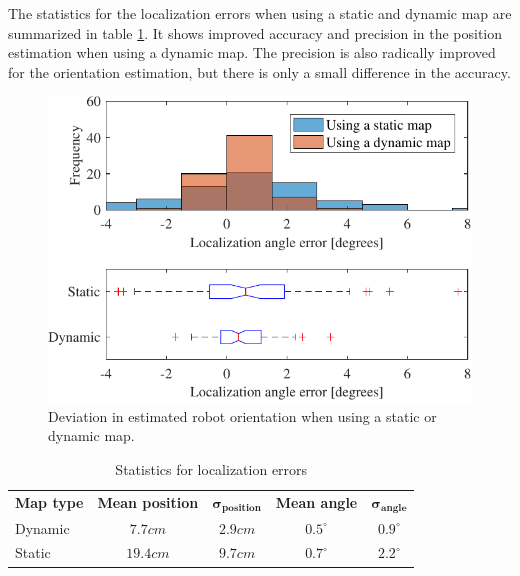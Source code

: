 The statistics for the localization errors when using a static and dynamic map are summarized in table \ref{tab:localization_errors}. It shows improved accuracy and precision in the position estimation when using a dynamic map. The precision is also radically improved for the orientation estimation, but there is only a small difference in the accuracy.
\begin{figure}
    \centering
    \includegraphics[scale=1]{chapters/evaluation/figures/localization_angle_error-crop}
    \caption{Deviation in estimated robot orientation when using a static or dynamic map.}
    \label{fig:precision_test_angles}
\end{figure}

\begin{table}[htbp]
    \caption{Statistics for localization errors}
    \label{tab:localization_errors}
    \begin{center}
        \begin{tabular}{l c  c  c  c}
            \toprule
            \textbf{Map type} & \textbf{Mean position} & $\boldsymbol{\sigma_{position}}$  & \textbf{Mean angle} & $\boldsymbol{\sigma_{angle}}$\\ 
            \rowcolor[gray]{0.925}
            Dynamic & $7.7cm$ & $2.9cm$ & $0.5^\circ$ & $0.9^\circ$  \\ 
            Static & $19.4cm$ & $9.7cm$ & $0.7^\circ$ & $2.2^\circ$  \\ 	
            \bottomrule
        \end{tabular} 
    \end{center}
\end{table}